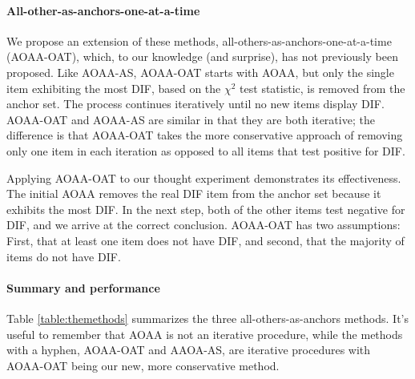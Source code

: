\documentclass[
  11pt,
]{article}
\begin{document}
\hypertarget{all-other-as-anchors-one-at-a-time}{%
\paragraph{All-other-as-anchors-one-at-a-time}\label{all-other-as-anchors-one-at-a-time}}

We propose an extension of these methods, all-others-as-anchors-one-at-a-time (AOAA-OAT), which, to our knowledge (and surprise), has not previously been proposed. Like AOAA-AS, AOAA-OAT starts with AOAA, but only the single item exhibiting the most DIF, based on the \(\chi^2\) test statistic, is removed from the anchor set. The process continues iteratively until no new items display DIF. AOAA-OAT and AOAA-AS are similar in that they are both iterative; the difference is that AOAA-OAT takes the more conservative approach of removing only one item in each iteration as opposed to all items that test positive for DIF.

Applying AOAA-OAT to our thought experiment demonstrates its effectiveness. The initial AOAA removes the real DIF item from the anchor set because it exhibits the most DIF. In the next step, both of the other items test negative for DIF, and we arrive at the correct conclusion. AOAA-OAT has two assumptions: First, that at least one item does not have DIF, and second, that the majority of items do not have DIF.

\hypertarget{summary-and-performance}{%
\paragraph{Summary and performance}\label{summary-and-performance}}

Table \ref{table:themethods} summarizes the three all-others-as-anchors methods. It's useful to remember that AOAA is not an iterative procedure, while the methods with a hyphen, AOAA-OAT and AAOA-AS, are iterative procedures with AOAA-OAT being our new, more conservative method.
\end{document}
